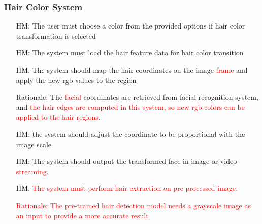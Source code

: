 \documentclass[12pt]{article}
\newcounter{reqnum} %
\newcounter{hmreqnum} %
\begin{document}
\subsubsection{Hair Color System}
    \begin{itemize}
        \item[HM\refstepcounter{hmreqnum}\thehmreqnum \label{R_Inputs}:] The user must choose a color from the provided options if hair color transformation is selected
        \item[HM\refstepcounter{hmreqnum}\thehmreqnum \label{R_Inputs}:] The system must load the hair feature data for hair color transition
        \item[HM\refstepcounter{hmreqnum}\thehmreqnum \label{R_Inputs}:] The system should map the hair coordinates on the \sout{image} \textcolor{red}{frame} and apply the new rgb values to the region
        \item[] Rationale: The \textcolor{red}{facial} coordinates are retrieved from facial recognition system, and \textcolor{red}{the hair edges are computed in this system, so new rgb colors can be applied to the hair regions}.
        \item[HM\refstepcounter{hmreqnum}\thehmreqnum \label{R_Inputs}:] the system should adjust the coordinate to be proportional with the image scale
        \item[HM\refstepcounter{hmreqnum}\thehmreqnum \label{R_Inputs}:] The system should output the transformed face in image or \sout{video} \textcolor{red}{streaming}.
        \item[HM\refstepcounter{hmreqnum}\thehmreqnum \label{R_Inputs}:] \textcolor{red}{The system must perform hair extraction on pre-processed image.}
        \item[] \textcolor{red}{Rationale: The pre-trained hair detection model needs a grayscale image as an input to provide a more accurate result}
    \end{itemize}
\end{document}
